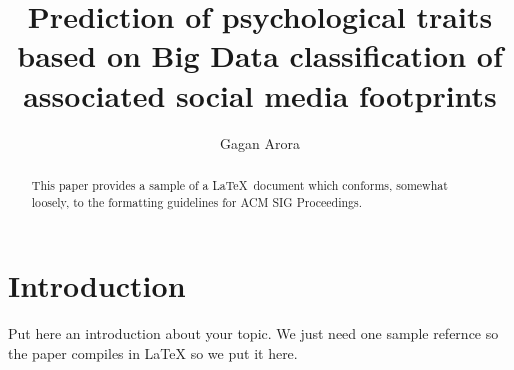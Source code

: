 \documentclass[sigconf]{acmart}
\begin{document}
\title{Prediction of psychological traits based on Big Data classification of associated social media footprints}


\author{Gagan Arora}
\orcid{}

\renewcommand{\shortauthors}{Gagan Arora}


\begin{abstract}
This paper provides a sample of a \LaTeX\ document which conforms,
somewhat loosely, to the formatting guidelines for
ACM SIG Proceedings.
\end{abstract}



\maketitle


\section{Introduction}

Put here an introduction about your topic. 
We just need one sample refernce so the paper compiles in LaTeX so we
put it here.
\end{document}
